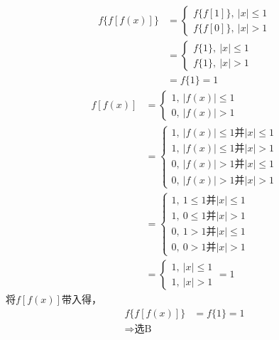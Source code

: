 \begin{Answer}
    \[
        \begin{aligned}
            f\{f[f(x)]\}&=\begin{cases}
                f\{f[1]\},\ |x| \le 1\\
                f\{f[0]\},\ |x| >1
            \end{cases}\\
            &=\begin{cases}
                f\{1\},\ |x| \le 1\\
                f\{1\},\ |x| >1
            \end{cases}\\
            &=f\{1\}=1
        \end{aligned}
    \]
    \[
       \begin{aligned}
            f[f(x)]&=\begin{cases}
                1,\ |f(x)| \le 1\\
                0,\ |f(x)| >1
            \end{cases}\\
            &=\begin{cases}
                1,\ |f(x)| \le 1 \text{并} |x| \le 1\\
                1,\ |f(x)| \le 1 \text{并} |x| >1\\
                0,\ |f(x)| >1 \text{并} |x| \le 1\\
                0,\ |f(x)| >1 \text{并} |x| >1
            \end{cases}\\
            &=\begin{cases}
                1,\ 1 \le 1 \text{并} |x| \le 1\\
                1,\ 0 \le 1 \text{并} |x| >1\\
                0,\ 1 >1 \text{并} |x| \le 1\\
                0,\ 0 >1 \text{并} |x| >1
            \end{cases}\\
            &= \begin{cases}
                1,\ |x| \le 1\\
                1,\ |x| >1
            \end{cases}=1
       \end{aligned}
    \]
    将$f[f(x)]$带入得，\[\begin{aligned}
            f\{f[f(x)]\}&= f\{1\}=1\\
            \Rightarrow \text{选B}
        \end{aligned}
    \]
\end{Answer}
